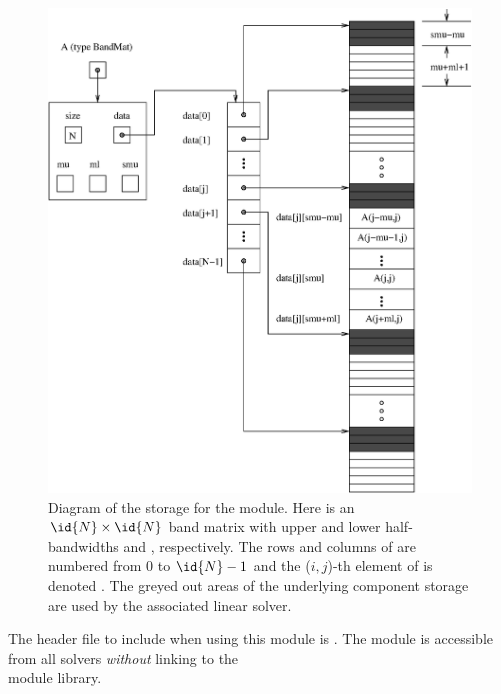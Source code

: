 \begin{figure}
\centerline{\includegraphics[width=4.5 in]{bandmat}}
\caption[Diagram of the storage for a {\sunmatband} object]
  {Diagram of the storage for the {\sunmatband} module. Here  is an
  $\id{N} \times \id{N}$ band matrix with upper and lower half-bandwidths 
  and , respectively. The rows and columns of  are
  numbered from $0$ to $\id{N}-1$ and the ($i,j$)-th element of  is
  denoted . The greyed out areas of the underlying
  component storage are used by the associated {\sunlinsolband}
  linear solver.}\label{f:sunbandmat}
\end{figure}

\noindent The header file to include when using this module
is . The {\sunmatband} module
is accessible from all {\sundials} solvers \textit{without}
linking to the \\
 module library. \\

